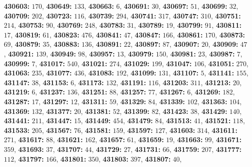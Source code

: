 \textsf{\bfseries 430603:} $170$, \textsf{\bfseries 430649:} $133$, \textsf{\bfseries 430663:} $6$, \textsf{\bfseries 430691:} $30$, \textsf{\bfseries 430697:} $51$, \textsf{\bfseries 430699:} $32$, \textsf{\bfseries 430709:} $202$, \textsf{\bfseries 430723:} $116$, \textsf{\bfseries 430739:} $294$, \textsf{\bfseries 430741:} $317$, \textsf{\bfseries 430747:} $310$, \textsf{\bfseries 430751:} $214$, \textsf{\bfseries 430753:} $90$, \textsf{\bfseries 430769:} $248$, \textsf{\bfseries 430783:} $31$, \textsf{\bfseries 430789:} $19$, \textsf{\bfseries 430799:} $91$, \textsf{\bfseries 430811:} $17$, \textsf{\bfseries 430819:} $61$, \textsf{\bfseries 430823:} $476$, \textsf{\bfseries 430841:} $47$, \textsf{\bfseries 430847:} $166$, \textsf{\bfseries 430861:} $170$, \textsf{\bfseries 430873:} $69$, \textsf{\bfseries 430879:} $35$, \textsf{\bfseries 430883:} $136$, \textsf{\bfseries 430891:} $22$, \textsf{\bfseries 430897:} $87$, \textsf{\bfseries 430907:} $20$, \textsf{\bfseries 430909:} $47$, \textsf{\bfseries 430921:} $139$, \textsf{\bfseries 430949:} $98$, \textsf{\bfseries 430957:} $13$, \textsf{\bfseries 430979:} $150$, \textsf{\bfseries 430981:} $23$, \textsf{\bfseries 430987:} $7$, \textsf{\bfseries 430999:} $7$, \textsf{\bfseries 431017:} $540$, \textsf{\bfseries 431021:} $274$, \textsf{\bfseries 431029:} $199$, \textsf{\bfseries 431047:} $106$, \textsf{\bfseries 431051:} $270$, \textsf{\bfseries 431063:} $235$, \textsf{\bfseries 431077:} $436$, \textsf{\bfseries 431083:} $192$, \textsf{\bfseries 431099:} $131$, \textsf{\bfseries 431107:} $5$, \textsf{\bfseries 431141:} $155$, \textsf{\bfseries 431147:} $38$, \textsf{\bfseries 431153:} $6$, \textsf{\bfseries 431173:} $132$, \textsf{\bfseries 431191:} $116$, \textsf{\bfseries 431203:} $311$, \textsf{\bfseries 431213:} $20$, \textsf{\bfseries 431219:} $6$, \textsf{\bfseries 431237:} $136$, \textsf{\bfseries 431251:} $88$, \textsf{\bfseries 431257:} $77$, \textsf{\bfseries 431267:} $6$, \textsf{\bfseries 431269:} $182$, \textsf{\bfseries 431287:} $17$, \textsf{\bfseries 431297:} $12$, \textsf{\bfseries 431311:} $59$, \textsf{\bfseries 431329:} $84$, \textsf{\bfseries 431339:} $102$, \textsf{\bfseries 431363:} $104$, \textsf{\bfseries 431369:} $132$, \textsf{\bfseries 431377:} $20$, \textsf{\bfseries 431381:} $52$, \textsf{\bfseries 431399:} $82$, \textsf{\bfseries 431423:} $38$, \textsf{\bfseries 431429:} $140$, \textsf{\bfseries 431441:} $211$, \textsf{\bfseries 431447:} $15$, \textsf{\bfseries 431449:} $454$, \textsf{\bfseries 431479:} $84$, \textsf{\bfseries 431513:} $41$, \textsf{\bfseries 431521:} $118$, \textsf{\bfseries 431533:} $205$, \textsf{\bfseries 431567:} $76$, \textsf{\bfseries 431581:} $159$, \textsf{\bfseries 431597:} $127$, \textsf{\bfseries 431603:} $314$, \textsf{\bfseries 431611:} $271$, \textsf{\bfseries 431617:} $88$, \textsf{\bfseries 431621:} $162$, \textsf{\bfseries 431657:} $61$, \textsf{\bfseries 431659:} $19$, \textsf{\bfseries 431663:} $99$, \textsf{\bfseries 431671:} $359$, \textsf{\bfseries 431693:} $37$, \textsf{\bfseries 431707:} $44$, \textsf{\bfseries 431729:} $27$, \textsf{\bfseries 431731:} $66$, \textsf{\bfseries 431759:} $207$, \textsf{\bfseries 431777:} $112$, \textsf{\bfseries 431797:} $166$, \textsf{\bfseries 431801:} $350$, \textsf{\bfseries 431803:} $397$, \textsf{\bfseries 431807:} $40$, 
